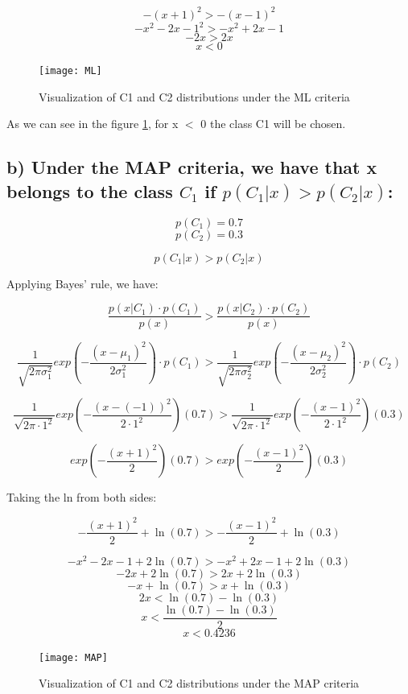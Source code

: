 \documentclass[a4paper]{article}
\begin{document}
$$ -(x+1)^2 > -(x-1)^2      $$
$$ -x^2-2x-1^2 > -x^2+2x-1  $$
$$ -2x > 2x                 $$
$$ \boxed{x < 0}            $$

\begin{figure}[h]
    \centering
    \texttt{[image: ML]}
    \caption{Visualization of C1 and C2 distributions under the ML criteria}
    \label{fig:ML}
\end{figure}

As we can see in the figure \ref{fig:ML}, for x $<$ 0 the class C1 will be chosen.

\subsection{b) Under the MAP criteria, we have that x belongs to the class $C_1$ if $p(C_1|x) > p(C_2|x)$:}

$$ p(C_1) = 0.7 $$
$$ p(C_2) = 0.3 $$

$$ p(C_1|x) > p(C_2|x) $$

Applying Bayes' rule, we have:

$$ \frac{p(x|C_1)\cdot p(C_1)}{p(x)} > \frac{p(x|C_2)\cdot p(C_2)}{p(x)} $$

$$ \frac{1}{\sqrt{2\pi\sigma_1^2}}exp\left(-\frac{(x-\mu_1)^2}{2 \sigma_1^2}\right)\cdot p(C_1) > \frac{1}{\sqrt{2\pi\sigma_2^2}}exp\left(-\frac{(x-\mu_2)^2}{2 \sigma_2^2}\right) \cdot p(C_2) $$

$$ \frac{1}{\sqrt{2\pi\cdot1^2}}exp\left(-\frac{(x-(-1))^2}{2\cdot1^2}\right) (0.7) > \frac{1}{\sqrt{2\pi\cdot1^2}}exp\left(-\frac{(x-1)^2}{2\cdot1^2}\right) (0.3) $$

$$ exp\left(-\frac{(x+1)^2}{2}\right) (0.7) > exp\left(-\frac{(x-1)^2}{2}\right) (0.3) $$

Taking the ln from both sides:

$$ -\frac{(x+1)^2}{2} + \ln(0.7) > -\frac{(x-1)^2}{2} + \ln(0.3) $$

$$ -x^2-2x-1 + 2\ln(0.7) > -x^2+2x-1 + 2\ln(0.3)    $$
$$ -2x + 2\ln(0.7) > 2x + 2\ln(0.3)                 $$
$$ -x + \ln(0.7) > x + \ln(0.3)                     $$
$$ 2x  < \ln(0.7) - \ln(0.3)                        $$
$$ x  < \frac{\ln(0.7) - \ln(0.3)}{2}               $$
$$ \boxed{x  < 0.4236}                              $$

\begin{figure}[h]
    \centering
    \texttt{[image: MAP]}
    \caption{Visualization of C1 and C2 distributions under the MAP criteria}
    \label{fig:MAP}
\end{figure}
\end{document}
